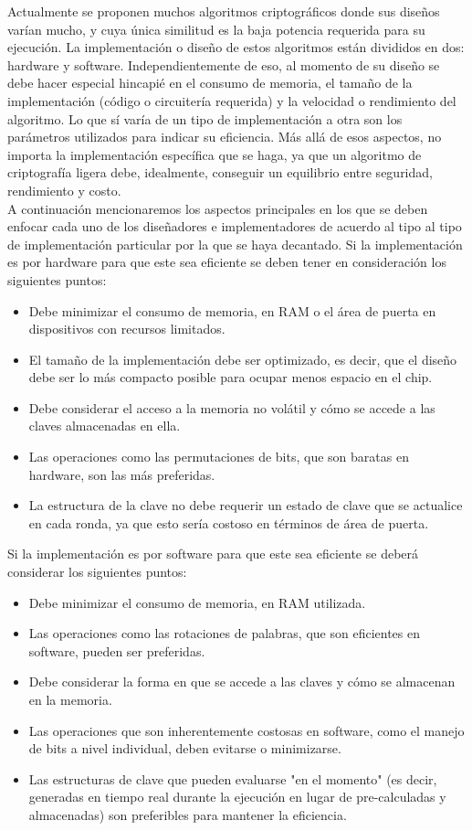 \documentclass[]{article}
\begin{document}
Actualmente se proponen muchos algoritmos criptográficos donde sus diseños varían mucho, y cuya única similitud es la baja potencia requerida para su ejecución. La implementación o diseño de estos algoritmos están divididos en dos: hardware y software. Independientemente de eso, al momento de su diseño se debe hacer especial hincapié en el consumo de memoria, el tamaño de la implementación (código o circuitería requerida) y la velocidad o rendimiento del algoritmo. Lo que sí varía de un tipo de implementación a otra son los parámetros utilizados para indicar su eficiencia. Más allá de esos aspectos, no importa la implementación específica que se haga, ya que un algoritmo de criptografía ligera debe, idealmente, conseguir un equilibrio entre seguridad, rendimiento y costo.
\\ A continuación mencionaremos los aspectos principales en los que se deben enfocar cada uno de los diseñadores e implementadores de acuerdo al tipo al tipo de implementación particular por la que se haya decantado.
Si la implementación es por hardware para que este sea eficiente se deben tener en consideración los siguientes puntos:
\begin{itemize}
	\item Debe minimizar el consumo de memoria, en RAM o el área de puerta en dispositivos con recursos limitados.
	\item El tamaño de la implementación debe ser optimizado, es decir, que el diseño debe ser lo más compacto posible para ocupar menos espacio en el chip.
	\item Debe considerar el acceso a la memoria no volátil y cómo se accede a las claves almacenadas en ella.
	\item Las operaciones como las permutaciones de bits, que son baratas en hardware, son las más preferidas.
	\item La estructura de la clave no debe requerir un estado de clave que se actualice en cada ronda, ya que esto sería costoso en términos de área de puerta.
\end{itemize}
Si la implementación es por software para que este sea eficiente se deberá considerar los siguientes puntos:
\begin{itemize}
	\item Debe minimizar el consumo de memoria, en RAM utilizada.
	\item Las operaciones como las rotaciones de palabras, que son eficientes en software, pueden ser preferidas.
	\item Debe considerar la forma en que se accede a las claves y cómo se almacenan en la memoria.
	\item Las operaciones que son inherentemente costosas en software, como el manejo de bits a nivel individual, deben evitarse o minimizarse.
	\item Las estructuras de clave que pueden evaluarse "en el momento" (es decir, generadas en tiempo real durante la ejecución en lugar de pre-calculadas y almacenadas) son preferibles para mantener la eficiencia.
\end{itemize}
\end{document}
